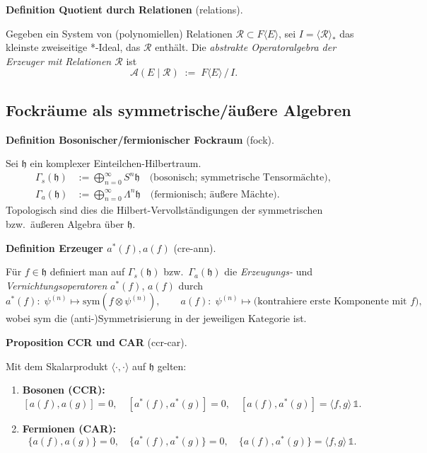 \documentclass[10pt, letterpaper]{article}
\newcommand{\CustomHeading}[3]{%
  \par\medskip\noindent%
  \textbf{#1 #2} \textnormal{(#3)}.\enskip%
}
\newenvironment{DEF}[2]{\begin{unitbox}\CustomHeading{Definition}{#1}{#2}}{\end{unitbox}}
\newenvironment{PROP}[2]{\begin{unitbox}\CustomHeading{Proposition}{#1}{#2}}{\end{unitbox}}
\begin{document}
\begin{DEF}{Quotient durch Relationen}{relations}
Gegeben ein System von (polynomiellen) Relationen $\mathcal{R}\subset F\langle E\rangle$, sei
$I=\langle \mathcal{R}\rangle_{*}$ das kleinste zweiseitige *-Ideal, das $\mathcal{R}$ enthält.
Die \emph{abstrakte Operatoralgebra der Erzeuger mit Relationen $\mathcal{R}$} ist
\[
\mathcal{A}(E\mid \mathcal{R}) \;:=\; F\langle E\rangle\,\big/\,I.
\]
\end{DEF}

\subsection{Fockräume als symmetrische/äußere Algebren}

\begin{DEF}{Bosonischer/fermionischer Fockraum}{fock}
Sei $\mathfrak{h}$ ein komplexer Einteilchen-Hilbertraum.
\begin{align*}
\Gamma_s(\mathfrak{h}) &:= \bigoplus_{n=0}^\infty S^n \mathfrak{h} 
\quad\text{(bosonisch; symmetrische Tensormächte)},\\
\Gamma_a(\mathfrak{h}) &:= \bigoplus_{n=0}^\infty \Lambda^n \mathfrak{h}
\quad\text{(fermionisch; äußere Mächte)}.
\end{align*}
Topologisch sind dies die Hilbert-Vervollständigungen der symmetrischen bzw.\ äußeren Algebra über $\mathfrak{h}$.
\end{DEF}

\begin{DEF}{Erzeuger $a^*(f),a(f)$}{cre-ann}
Für $f\in \mathfrak{h}$ definiert man auf $\Gamma_s(\mathfrak{h})$ bzw.\ $\Gamma_a(\mathfrak{h})$
die \emph{Erzeugungs-} und \emph{Vernichtungsoperatoren} $a^*(f)$, $a(f)$ durch
\[
a^*(f):\; \psi^{(n)} \mapsto \mathrm{sym}(f\otimes \psi^{(n)}),\qquad
a(f):\; \psi^{(n)} \mapsto \text{(kontrahiere erste Komponente mit }f),
\]
wobei $\mathrm{sym}$ die (anti-)Symmetrisierung in der jeweiligen Kategorie ist.
\end{DEF}

\begin{PROP}{CCR und CAR}{ccr-car}
Mit dem Skalarprodukt $\langle\cdot,\cdot\rangle$ auf $\mathfrak{h}$ gelten:
\begin{enumerate}[label=(\roman*),leftmargin=*]
\item \textbf{Bosonen (CCR):}
\[
[a(f),a(g)] = 0,\quad [a^*(f),a^*(g)] = 0,\quad
[a(f),a^*(g)] = \langle f,g\rangle\,\mathbb{1}.
\]
\item \textbf{Fermionen (CAR):}
\[
\{a(f),a(g)\}=0,\quad \{a^*(f),a^*(g)\}=0,\quad
\{a(f),a^*(g)\} = \langle f,g\rangle\,\mathbb{1}.
\]
\end{enumerate}
\end{PROP}
\end{document}
